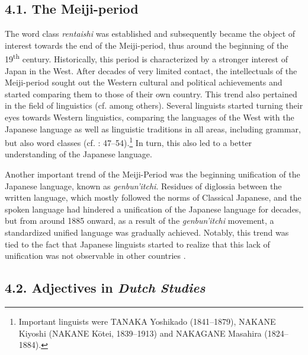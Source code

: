 \documentclass[output=paper]{langscibook}
\begin{document}
\subsection{4.1. The Meiji-period}

The word class \textit{rentaishi} was established and subsequently became the object of interest towards the end of the Meiji-period, thus around the beginning of the 19\textsuperscript{th} century. Historically, this period is characterized by a stronger interest of Japan in the West. After decades of very limited contact, the intellectuals of the Meiji-period sought out the Western cultural and political achievements and started comparing them to those of their own country. This trend also pertained in the field of linguistics (cf. \citealt{Heinrich2002} among others). Several linguists started turning their eyes towards Western linguistics, comparing the languages of the West with the Japanese language as well as linguistic traditions in all areas, including grammar, but also word classes (cf. \citealt{Sugimoto1991}: 47–54).\footnote{Important linguists were TANAKA Yoshikado (1841–1879), NAKANE Kiyoshi (NAKANE Kōtei, 1839–1913) and NAKAGANE Masahira (1824–1884).} In turn, this also led to a better understanding of the Japanese language. 

Another important trend of the Meiji-Period was the beginning unification of the Japanese language, known as \textit{genbun’itchi}. Residues of diglossia between the written language, which mostly followed the norms of Classical Japanese, and the spoken language had hindered a unification of the Japanese language for decades, but from around 1885 onward, as a result of the \textit{genbun’itchi} movement, a standardized unified language was gradually achieved. Notably, this trend was tied to the fact that Japanese linguists started to realize that this lack of unification was not observable in other countries \citep{Gottlieb1991}.

\subsection{4.2. Adjectives in \textit{Dutch Studies}}
\end{document}
